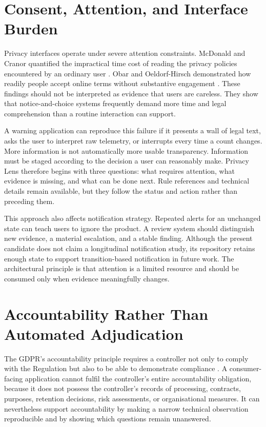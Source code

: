 \section{Consent, Attention, and Interface Burden}

Privacy interfaces operate under severe attention constraints. McDonald and Cranor quantified the impractical time cost of reading the privacy policies encountered by an ordinary user \cite{mcdonald2008}. Obar and Oeldorf-Hirsch demonstrated how readily people accept online terms without substantive engagement \cite{obar2020}. These findings should not be interpreted as evidence that users are careless. They show that notice-and-choice systems frequently demand more time and legal comprehension than a routine interaction can support.

A warning application can reproduce this failure if it presents a wall of legal text, asks the user to interpret raw telemetry, or interrupts every time a count changes. More information is not automatically more usable transparency. Information must be staged according to the decision a user can reasonably make. Privacy Lens therefore begins with three questions: what requires attention, what evidence is missing, and what can be done next. Rule references and technical details remain available, but they follow the status and action rather than preceding them.

This approach also affects notification strategy. Repeated alerts for an unchanged state can teach users to ignore the product. A review system should distinguish new evidence, a material escalation, and a stable finding. Although the present candidate does not claim a longitudinal notification study, its repository retains enough state to support transition-based notification in future work. The architectural principle is that attention is a limited resource and should be consumed only when evidence meaningfully changes.

\section{Accountability Rather Than Automated Adjudication}

The GDPR's accountability principle requires a controller not only to comply with the Regulation but also to be able to demonstrate compliance \cite{gdpr2016}. A consumer-facing application cannot fulfil the controller's entire accountability obligation, because it does not possess the controller's records of processing, contracts, purposes, retention decisions, risk assessments, or organisational measures. It can nevertheless support accountability by making a narrow technical observation reproducible and by showing which questions remain unanswered.

